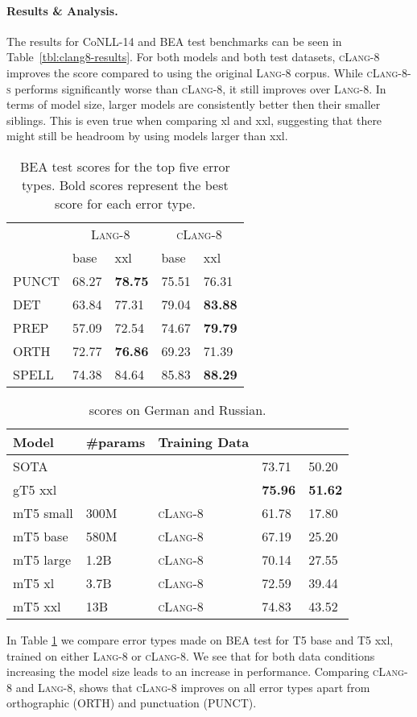 \documentclass[11pt,a4paper]{article}
\newcommand{\lang}[0]{{\scshape Lang-8}\xspace}
\newcommand{\clangg}[0]{{\scshape cLang-8}\xspace}
\newcommand{\clangs}[0]{{\scshape cLang-8-s}\xspace}
\newcommand{\conll}[0]{CoNLL-14\xspace}
\newcommand{\beatest}[0]{BEA test\xspace}
\newcommand*\rot{\rotatebox{60}}
\begin{document}
\paragraph*{Results \& Analysis.}
The results for \conll and \beatest benchmarks can be seen in Table~\ref{tbl:clang8-results}.
For both models and both test datasets, \clangg improves the \fzero score compared to using the original \lang corpus.
While \clangs performs significantly worse than \clangg, it still improves over \lang.
In terms of model size, larger models are consistently better then their smaller siblings.
This is even true when comparing xl and xxl, suggesting that there might still be headroom by using models larger than xxl.


\begin{table}[t]
\footnotesize
\begin{tabularx}{\columnwidth}{XXXXX}
\toprule
 & \multicolumn{2}{c}{\lang} & \multicolumn{2}{c}{\clangg} \\
 & base & xxl & base & xxl \\ \midrule 
PUNCT &  68.27 & \textbf{78.75} & 75.51 & {76.31} \\
DET    & 63.84 & 77.31 & 79.04 & \textbf{83.88} \\
PREP&    57.09 & 72.54 & 74.67& \textbf{79.79} \\
ORTH &   72.77 & \textbf{76.86} & 69.23& 71.39 \\
SPELL &  74.38 & 84.64 & {85.83} & \textbf{88.29} \\
\bottomrule 
\end{tabularx}
\caption{\beatest scores for the top five error types.  Bold scores represent the best score for each error type.}
\label{tbl:error}
\end{table}

\begin{table}[t]
\footnotesize
\setlength{\tabcolsep}{5pt}
\begin{tabularx}{\columnwidth}{llXll}
\toprule
Model & \#params & Training Data & \rot{German}  & \rot{Russian}  \\
\midrule
SOTA  &  & & 73.71 & 50.20  \\ 
gT5 xxl & & & \textbf{75.96} & \textbf{51.62} \\
\midrule
mT5 small & 300M & \clangg & 61.78 & 17.80 \\ 
mT5 base  & 580M & \clangg & 67.19 & 25.20 \\ 
mT5 large & 1.2B & \clangg & 70.14 & 27.55 \\ 
mT5 xl    & 3.7B & \clangg & 72.59 & 39.44 \\ 
mT5 xxl   & 13B & \clangg & 74.83 & 43.52 \\  
\bottomrule
\end{tabularx}
\caption{\fzero scores on German and Russian.}
\label{tbl:clang8-mt5-results}
\end{table}
In Table \ref{tbl:error} we compare error types made on \beatest for T5 base and T5 xxl, trained on either \lang or \clangg. We see that for both data conditions increasing the model size leads to an increase in performance.
Comparing \clangg and \lang, shows that \clangg improves on all error types apart from orthographic (ORTH) and punctuation (PUNCT).
\end{document}
